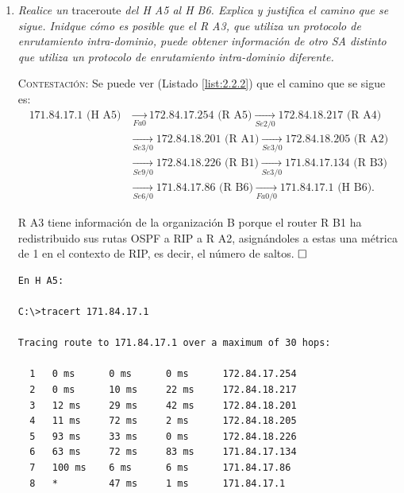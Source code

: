 \documentclass[twoside, 11pt]{article}
\begin{document}
\begin{enumerate}
    \item \textit{Realice un} traceroute \textit{del H A5 al H B6. Explica y justifica el camino que se sigue. Inidque cómo es posible que el R A3, que utiliza un protocolo de enrutamiento intra-dominio, puede obtener información de otro SA distinto que utiliza un protocolo de enrutamiento intra-dominio diferente.}
    \label{ej:2.2.2}

    \vspace{7px}

    \textsc{Contestación}: 
    Se puede ver (Listado \ref{list:2.2.2}) que el camino que se sigue es:
    \begin{equation*}
        \begin{split}
            \text{171.84.17.1 (H A5)} &\xrightarrow[Fa0]{} \text{172.84.17.254 (R A5)} \xrightarrow[Se2/0]{} \text{172.84.18.217 (R A4)} \\
            &\xrightarrow[Se3/0]{} \text{172.84.18.201 (R A1)} \xrightarrow[Se3/0]{} \text{172.84.18.205 (R A2)} \\
            &\xrightarrow[Se9/0]{} \text{172.84.18.226 (R B1)} \xrightarrow[Se3/0]{} \text{171.84.17.134 (R B3)} \\ 
            &\xrightarrow[Se6/0]{} \text{171.84.17.86 (R B6)} \xrightarrow[Fa0/0]{} \text{171.84.17.1 (H B6)}.
        \end{split}
    \end{equation*}

    R A3 tiene información de la organización B porque el router R B1 ha redistribuido sus rutas OSPF a RIP a R A2, asignándoles a estas una métrica de 1 en el contexto de RIP, es decir, el número de saltos. $\hfill\square$
    
\begin{center}
\begin{verbatim}
En H A5:

C:\>tracert 171.84.17.1

Tracing route to 171.84.17.1 over a maximum of 30 hops: 

  1   0 ms      0 ms      0 ms      172.84.17.254
  2   0 ms      10 ms     22 ms     172.84.18.217
  3   12 ms     29 ms     42 ms     172.84.18.201
  4   11 ms     72 ms     2 ms      172.84.18.205
  5   93 ms     33 ms     0 ms      172.84.18.226
  6   63 ms     72 ms     83 ms     171.84.17.134
  7   100 ms    6 ms      6 ms      171.84.17.86
  8   *         47 ms     1 ms      171.84.17.1


\end{verbatim}
\end{center}
\end{enumerate}
\end{document}

